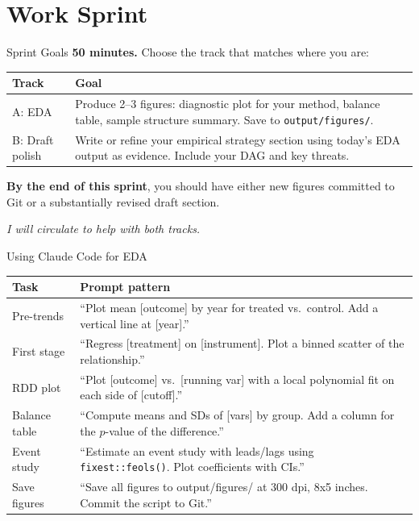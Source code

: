 \section{Work Sprint}

\begin{frame}{Sprint Goals}
  \textbf{\textcolor{usfgreen}{50 minutes.}} Choose the track that matches where you are:

  \vspace{6pt}

  \small
  \begin{tabular}{@{}l>{\raggedright\arraybackslash}p{8.5cm}@{}}
    \toprule
    \textbf{Track} & \textbf{Goal} \\
    \midrule
    A: EDA &
      Produce 2--3 figures: diagnostic plot for your method, balance table, sample structure summary. Save to \texttt{output/figures/}. \\[6pt]
    B: Draft polish &
      Write or refine your empirical strategy section using today's EDA output as evidence. Include your DAG and key threats. \\
    \bottomrule
  \end{tabular}

  \normalsize

  \vspace{8pt}

  \textbf{By the end of this sprint}, you should have either new figures committed to Git or a substantially revised draft section.

  \vspace{4pt}

  \textit{I will circulate to help with both tracks.}
\end{frame}

\begin{frame}{Using Claude Code for EDA}
  \footnotesize
  \begin{tabular}{@{}l>{\raggedright\arraybackslash}p{8cm}@{}}
    \toprule
    \textbf{Task} & \textbf{Prompt pattern} \\
    \midrule
    Pre-trends &
      ``Plot mean [outcome] by year for treated vs.\ control. Add a vertical line at [year].'' \\[2pt]
    First stage &
      ``Regress [treatment] on [instrument]. Plot a binned scatter of the relationship.'' \\[2pt]
    RDD plot &
      ``Plot [outcome] vs.\ [running var] with a local polynomial fit on each side of [cutoff].'' \\[2pt]
    Balance table &
      ``Compute means and SDs of [vars] by group. Add a column for the $p$-value of the difference.'' \\[2pt]
    Event study &
      ``Estimate an event study with leads/lags using \texttt{fixest::feols()}. Plot coefficients with CIs.'' \\[2pt]
    Save figures &
      ``Save all figures to output/figures/ at 300 dpi, 8x5 inches. Commit the script to Git.'' \\
    \bottomrule
  \end{tabular}
\end{frame}

